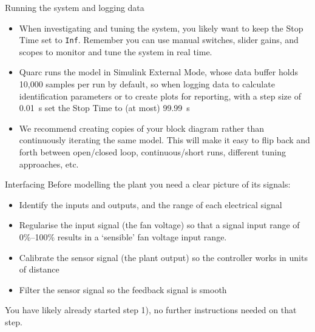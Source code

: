 \documentclass[9pt]{beamer-control}
\begin{document}
\begin{frame}{Running the system and logging data}

  \begin{itemize}
    \item When investigating and tuning the system, you likely want to keep the \textsf{Stop Time} set to \texttt{Inf}. Remember you can use manual switches, slider gains, and scopes to monitor and tune the system in real time.

    \item Quarc runs the model in Simulink External Mode, whose data buffer holds 10,000 samples per run by default, so when logging data to calculate identification parameters or to create plots for reporting, with a step size of \qty{0.01}{s} set the \textsf{Stop Time} to (at most) \qty{99.99}{s}
	
	\item We recommend creating copies of your block diagram rather than continuously iterating the same model. This will make it easy to flip back and forth between open/closed loop, continuous/short runs, different tuning approaches, etc.
	\end{itemize}

\end{frame}



\begin{frame}{Interfacing}
  Before modelling the plant you need a clear picture of its signals:
  \begin{itemize}
    \item[1)] Identify the inputs and outputs, and the range of each electrical signal
    \item[2)] Regularise the input signal (the fan voltage) so that a signal input range of 0\%--100\% results in a `sensible' fan voltage input range.
    \item[3)] Calibrate the sensor signal (the plant output) so the controller works in units of distance
    \item[4)] Filter the sensor signal so the feedback signal is smooth
  \end{itemize}
  You have likely already started step 1), no further instructions needed on that step.
\end{frame}
\end{document}
